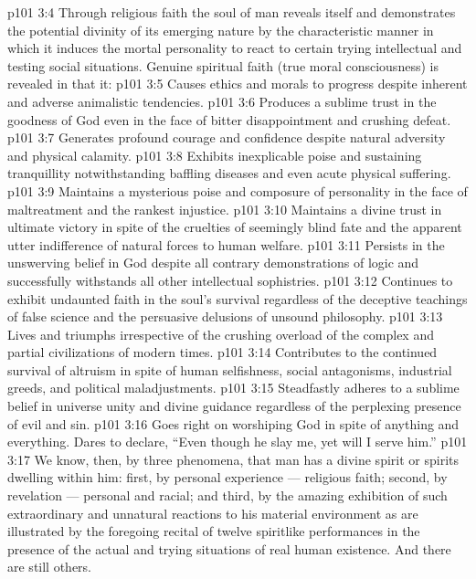 \vs p101 3:4 Through religious faith the soul of man reveals itself and demonstrates the potential divinity of its emerging nature by the characteristic manner in which it induces the mortal personality to react to certain trying intellectual and testing social situations. Genuine spiritual faith (true moral consciousness) is revealed in that it:
\vs p101 3:5 \bibnobreakspace Causes ethics and morals to progress despite inherent and adverse animalistic tendencies.
\vs p101 3:6 \bibnobreakspace Produces a sublime trust in the goodness of God even in the face of bitter disappointment and crushing defeat.
\vs p101 3:7 \bibnobreakspace Generates profound courage and confidence despite natural adversity and physical calamity.
\vs p101 3:8 \bibnobreakspace Exhibits inexplicable poise and sustaining tranquillity notwithstanding baffling diseases and even acute physical suffering.
\vs p101 3:9 \bibnobreakspace Maintains a mysterious poise and composure of personality in the face of maltreatment and the rankest injustice.
\vs p101 3:10 \bibnobreakspace Maintains a divine trust in ultimate victory in spite of the cruelties of seemingly blind fate and the apparent utter indifference of natural forces to human welfare.
\vs p101 3:11 \bibnobreakspace Persists in the unswerving belief in God despite all contrary demonstrations of logic and successfully withstands all other intellectual sophistries.
\vs p101 3:12 \bibnobreakspace Continues to exhibit undaunted faith in the soul’s survival regardless of the deceptive teachings of false science and the persuasive delusions of unsound philosophy.
\vs p101 3:13 \bibnobreakspace Lives and triumphs irrespective of the crushing overload of the complex and partial civilizations of modern times.
\vs p101 3:14 \bibnobreakspace Contributes to the continued survival of altruism in spite of human selfishness, social antagonisms, industrial greeds, and political maladjustments.
\vs p101 3:15 \bibnobreakspace Steadfastly adheres to a sublime belief in universe unity and divine guidance regardless of the perplexing presence of evil and sin.
\vs p101 3:16 \bibnobreakspace Goes right on worshiping God in spite of anything and everything. Dares to declare, “Even though he slay me, yet will I serve him.”
\vs p101 3:17 \pc We know, then, by three phenomena, that man has a divine spirit or spirits dwelling within him: first, by personal experience --- religious faith; second, by revelation --- personal and racial; and third, by the amazing exhibition of such extraordinary and unnatural reactions to his material environment as are illustrated by the foregoing recital of twelve spiritlike performances in the presence of the actual and trying situations of real human existence. And there are still others.
